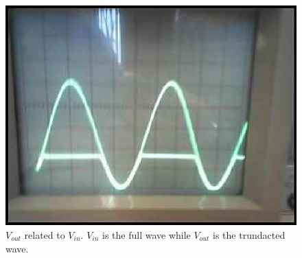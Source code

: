 \documentclass[11pt,onecolumn]{article}
\begin{document}
%
%
\begin{figure} %
\center
\includegraphics{Image2.eps}
\caption{$V_{out}$ related to $V_{in}$. $V_{in}$ is the full wave while $V_{out}$ is the trundacted wave.}\label{fig:Image2} %
\end{figure}
\end{document}
